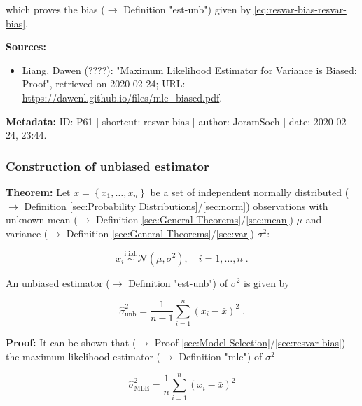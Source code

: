 \documentclass[a4paper,12pt]{book}
\begin{document}
which proves the bias ($\rightarrow$ Definition "est-unb") given by \eqref{eq:resvar-bias-resvar-bias}.


\vspace{1em}
\textbf{Sources:}
\begin{itemize}
\item Liang, Dawen (????): "Maximum Likelihood Estimator for Variance is Biased: Proof", retrieved on 2020-02-24; URL: \url{https://dawenl.github.io/files/mle_biased.pdf}.
\end{itemize}


\vspace{1em}
\textbf{Metadata:} ID: P61 | shortcut: resvar-bias | author: JoramSoch | date: 2020-02-24, 23:44.


\subsubsection[\textbf{Construction of unbiased estimator}]{Construction of unbiased estimator} \label{sec:resvar-unb}

\vspace{1em}
\textbf{Theorem:} Let $x = \left\lbrace x_1, \ldots, x_n \right\rbrace$ be a set of independent normally distributed ($\rightarrow$ Definition \ref{sec:Probability Distributions}/\ref{sec:norm}) observations with unknown mean ($\rightarrow$ Definition \ref{sec:General Theorems}/\ref{sec:mean}) $\mu$ and variance ($\rightarrow$ Definition \ref{sec:General Theorems}/\ref{sec:var}) $\sigma^2$:

\begin{equation} \label{eq:resvar-unb-ug}
x_i \overset{\text{i.i.d.}}{\sim} \mathcal{N}(\mu, \sigma^2), \quad i = 1,\ldots,n \; .
\end{equation}

An unbiased estimator ($\rightarrow$ Definition "est-unb") of $\sigma^2$ is given by

\begin{equation} \label{eq:resvar-unb-resvar-unb}
\hat{\sigma}^2_{\mathrm{unb}} = \frac{1}{n-1} \sum_{i=1}^{n} \left( x_i - \bar{x} \right)^2 \; .
\end{equation}


\vspace{1em}
\textbf{Proof:} It can be shown that ($\rightarrow$ Proof \ref{sec:Model Selection}/\ref{sec:resvar-bias}) the maximum likelihood estimator ($\rightarrow$ Definition "mle") of $\sigma^2$

\begin{equation} \label{eq:resvar-unb-resvar-mle}
\hat{\sigma}^2_{\mathrm{MLE}} = \frac{1}{n} \sum_{i=1}^{n} \left( x_i - \bar{x} \right)^2
\end{equation}
\end{document}
